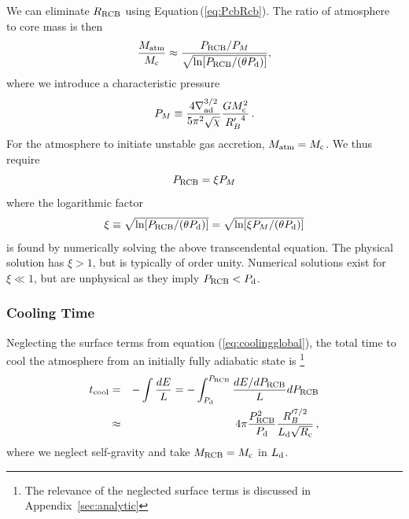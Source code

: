 \documentclass[apj]{emulateapj}
\newcommand{\delad}{\nabla_{\rm ad}}
\newcommand{\Eq}[1]{Equation\,(\ref{#1})}
\newcommand{\App}[1]{Appendix~\ref{#1}}
\newcommand{\co}{_{\rm c}}
\newcommand{\di}{_{\rm d}}
\newcommand{\cb}{_{\rm RCB}}
\begin{document}
We can eliminate $R\cb$ using \Eq{eq:PcbRcb}.  The ratio of atmosphere to core mass is then  
\begin{equation} \label{eq:crit}
{M_{\rm atm} \over M\co} \approx {P\cb /P_M \over  \sqrt{\ln[ P\cb/(\theta P_{\rm d})]}},
\end{equation} 
where we introduce a characteristic pressure
\begin{equation} 
P_M \equiv {4 \delad^{3/2} \over 5 \pi^2 \sqrt{\chi} } {G M\co^2 \over {R_B'}^4}\, .
\end{equation} 
For the atmosphere to initiate unstable gas accretion, $M_{\rm atm} = M\co$. We thus require
\begin{equation} \label{eq:Pcbc}
P\cb = \xi P_M
\end{equation} 
where  the logarithmic factor
\begin{equation}\label{eq:xi}
\xi \equiv \sqrt{\ln[ P\cb/(\theta P_{\rm d})]} = \sqrt{\ln[ \xi P_M / (\theta P_{\rm d})]}
\end{equation} 
is found by numerically solving the above transcendental equation. The physical solution has $\xi >1$, but is typically of order unity. Numerical solutions exist for $\xi \ll 1$, but are unphysical as they imply $P\cb < P_{\rm d}$.

\subsubsection{Cooling Time}
Neglecting the surface terms from equation (\ref{eq:coolingglobal}), the total time to cool the atmosphere from an initially fully adiabatic state is \footnote{The relevance of the neglected surface terms is discussed in \App{sec:analytic}}
\begin{eqnarray} 
t_{\rm  cool} &=& -\int {d E \over L} = - \int_{P\di}^{P\cb } {d E/d P\cb \over L} dP\cb \\
&\approx& 4 \pi {P\cb^{2} \over P\di} {R_B'^{7/2} \over L\di \sqrt{R\co}} \label{eq:tcool}\, ,
\end{eqnarray} 
where we neglect self-gravity and take $M\cb = M\co$ in $L\di$.
\end{document}
